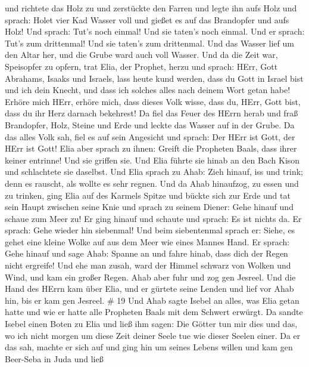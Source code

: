 und richtete das Holz zu und zerstückte den Farren und legte ihn aufs
Holz  und sprach: Holet vier Kad Wasser voll und gießet es
auf das Brandopfer und aufs Holz! Und sprach: Tut's noch einmal! Und sie
taten's noch einmal. Und er sprach: Tut's zum drittenmal! Und sie
taten's zum drittenmal.  Und das Wasser lief um den Altar
her, und die Grube ward auch voll Wasser.  Und da die Zeit
war, Speisopfer zu opfern, trat Elia, der Prophet, herzu und sprach:
HErr, Gott Abrahams, Isaaks und Israels, lass heute kund werden, dass du
Gott in Israel bist und ich dein Knecht, und dass ich solches alles nach
deinem Wort getan habe!  Erhöre mich HErr, erhöre mich,
dass dieses Volk wisse, dass du, HErr, Gott bist, dass du ihr Herz
darnach bekehrest!  Da fiel das Feuer des HErrn herab und
fraß Brandopfer, Holz, Steine und Erde und leckte das Wasser auf in der
Grube.  Da das alles Volk sah, fiel es auf sein Angesicht
und sprach: Der HErr ist Gott, der HErr ist Gott!  Elia
aber sprach zu ihnen: Greift die Propheten Baals, dass ihrer keiner
entrinne! Und sie griffen sie. Und Elia führte sie hinab an den Bach
Kison und schlachtete sie daselbst.  Und Elia sprach zu
Ahab: Zieh hinauf, iss und trink; denn es rauscht, als wollte es sehr
regnen.  Und da Ahab hinaufzog, zu essen und zu trinken,
ging Elia auf des Karmels Spitze und bückte sich zur Erde und tat sein
Haupt zwischen seine Knie  und sprach zu seinem Diener:
Gehe hinauf und schaue zum Meer zu! Er ging hinauf und schaute und
sprach: Es ist nichts da. Er sprach: Gehe wieder hin siebenmal!
 Und beim siebentenmal sprach er: Siehe, es gehet eine
kleine Wolke auf aus dem Meer wie eines Mannes Hand. Er sprach: Gehe
hinauf und sage Ahab: Spanne an und fahre hinab, dass dich der Regen
nicht ergreife!  Und ehe man zusah, ward der Himmel schwarz
von Wolken und Wind, und kam ein großer Regen. Ahab aber fuhr und zog
gen Jesreel.  Und die Hand des HErrn kam über Elia, und er
gürtete seine Lenden und lief vor Ahab hin, bis er kam gen Jesreel. \#
19  Und Ahab sagte Isebel an alles, was Elia getan hatte und
wie er hatte alle Propheten Baals mit dem Schwert erwürgt. 
Da sandte Isebel einen Boten zu Elia und ließ ihm sagen: Die Götter tun
mir dies und das, wo ich nicht morgen um diese Zeit deiner Seele tue wie
dieser Seelen einer.  Da er das sah, machte er sich auf und
ging hin um seines Lebens willen und kam gen Beer-Seba in Juda und ließ
